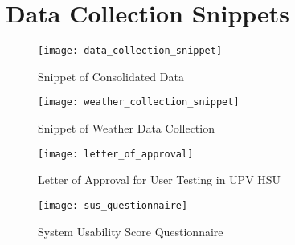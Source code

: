 %
%
%                 

\chapter{Data Collection Snippets}
\label{sec:appendixa}

\begin{figure}[ht]
	\centering
	\texttt{[image: data\_collection\_snippet]}
	\caption{Snippet of Consolidated Data}
\end{figure}

\begin{figure}[ht]
	\centering
	\texttt{[image: weather\_collection\_snippet]}
	\caption{Snippet of Weather Data Collection}
\end{figure}

\begin{figure}[ht]
	\centering
	\texttt{[image: letter\_of\_approval]}
	\caption{Letter of Approval for User Testing in UPV HSU}
\end{figure}

\begin{figure}[ht]
	\centering
	\texttt{[image: sus\_questionnaire]}
	\caption{System Usability Score Questionnaire}
\end{figure}

%


